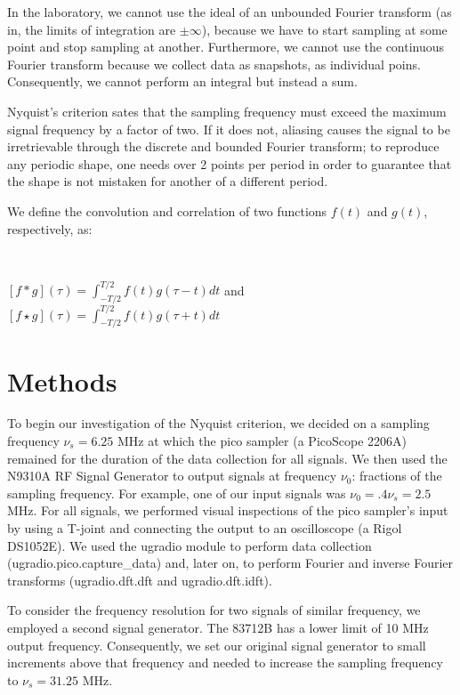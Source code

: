 \documentclass[a4paper]{article}
\begin{document}
In the laboratory, we cannot use the ideal of an unbounded Fourier transform (as in, the limits of integration are $\pm \infty$), because we have to start sampling at some point and stop sampling at another. Furthermore, we cannot use the continuous Fourier transform because we collect data as snapshots, as individual poins. Consequently, we cannot perform an integral but instead a sum. 

Nyquist's criterion sates that the sampling frequency must exceed the maximum signal frequency by a factor of two. If it does not, aliasing causes the signal to be irretrievable through the discrete and bounded Fourier transform; to reproduce any periodic shape, one needs over 2 points per period in order to guarantee that the shape is not mistaken for another of a different period.

We define the convolution and correlation of two functions $f(t)$ and $g(t)$, respectively, as:

\

$[f * g](\tau) = \int_{-T / 2}^{T / 2} f(t) g(\tau - t) dt$ \quad and \quad $[f \star g](\tau) = \int_{-T / 2}^{T / 2} f(t) g(\tau + t) dt$

\section{Methods}


\quad \quad To begin our investigation of the Nyquist criterion, we decided on a sampling frequency $\nu_s = 6.25$ MHz at which the pico sampler (a PicoScope 2206A) remained for the duration of the data collection for all signals. We then used the N9310A RF Signal Generator to output signals at frequency $\nu_0$: fractions of the sampling frequency. For example, one of our input signals was $\nu_0 = .4 \nu_s = 2.5$ MHz. For all signals, we performed visual inspections of the pico sampler's input by using a T-joint and connecting the output to an oscilloscope (a Rigol DS1052E). We used the ugradio module to perform data collection (ugradio.pico.capture\_data) and, later on, to perform Fourier and inverse Fourier transforms (ugradio.dft.dft and ugradio.dft.idft).

To consider the frequency resolution for two signals of similar frequency, we employed a second signal generator. The 83712B has a lower limit of 10 MHz output frequency. Consequently, we set our original signal generator to small increments above that frequency and needed to increase the sampling frequency to $\nu_s = 31.25$ MHz.
\end{document}

